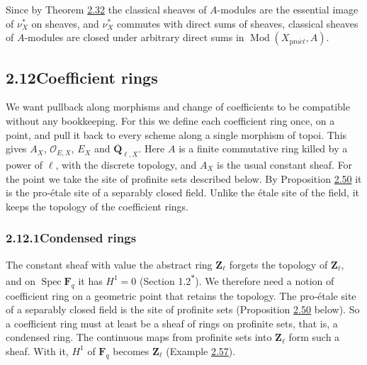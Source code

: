 \documentclass[11pt]{article}
\newcommand{\bpout}[1]{#1\textsuperscript{\hyperlink{bp-outside}{\ensuremath{\ast}}}}
\providecommand{\QbarX}{}\renewcommand{\QbarX}{\overline{\mathbf Q}_{\ell,X}}
\begin{document}
\label{bp146}%
Since by Theorem \hyperref[bp93]{2.32} the classical sheaves of \(A\)-modules are the essential image of \(\nu_X^*\) on sheaves, and \(\nu_X^*\) commutes with direct sums of sheaves, classical sheaves of \(A\)-modules are closed under arbitrary direct sums in \(\operatorname{Mod}(X_{\mathrm{pro}\acute{e}t},A)\).


\subsection*{\texorpdfstring{2.12\quad Coefficient rings}{2.12 Coefficient rings}}
\label{bp147}%
\label{bp148}%
We want pullback along morphisms and change of coefficients to be compatible without any bookkeeping. For this we define each coefficient ring once, on a point, and pull it back to every scheme along a single morphism of topoi. This gives \(A_X\), \(\mathcal O_{E,X}\), \(E_X\) and \(\QbarX\). Here \(A\) is a finite commutative ring killed by a power of \(\ell\), with the discrete topology, and \(A_X\) is the usual constant sheaf. For the point we take the site of profinite sets described below. By Proposition \hyperref[bp151]{2.50} it is the pro-étale site of a separably closed field. Unlike the étale site of the field, it keeps the topology of the coefficient rings.

\subsubsection*{\texorpdfstring{2.12.1\quad Condensed rings}{2.12.1 Condensed rings}}
\label{bp149}%
\label{bp150}%
The constant sheaf with value the abstract ring \(\mathbf Z_\ell\) forgets the topology of \(\mathbf Z_\ell\), and on \(\operatorname{Spec}\mathbf F_q\) it has \(H^1=0\) (Section \bpout{1.2}). We therefore need a notion of coefficient ring on a geometric point that retains the topology. The pro-étale site of a separably closed field is the site of profinite sets (Proposition \hyperref[bp151]{2.50} below). So a coefficient ring must at least be a sheaf of rings on profinite sets, that is, a condensed ring. The continuous maps from profinite sets into \(\mathbf Z_\ell\) form such a sheaf. With it, \(H^1\) of \(\mathbf F_q\) becomes \(\mathbf Z_\ell\) (Example \hyperref[bp176]{2.57}).
\end{document}
